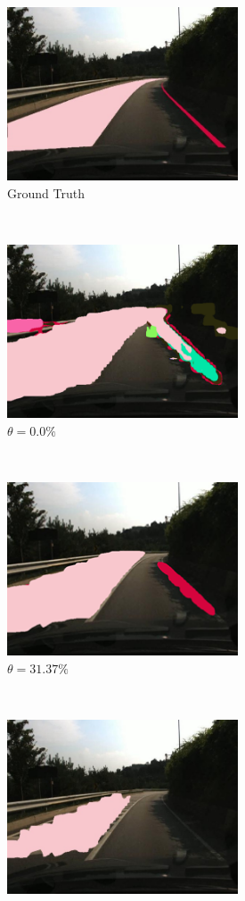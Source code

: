 \begin{spacing}{1.5}
\begin{figure}[!ht]
    \centering
    \begin{subfigure}[b]{0.49\textwidth}
        \centering
        \includegraphics[width=2.7in, fbox]{Chapter5/Picture3an.jpg}
        \caption{Ground Truth}
    \end{subfigure}%
    ~
    \begin{subfigure}[b]{0.49\textwidth}
        \centering
        \includegraphics[width=2.7in, fbox]{Chapter5/pic1conf0.png}
        \caption{$\theta = 0.0\%$}
    \end{subfigure}
    \\
    \begin{subfigure}[b]{0.49\textwidth}
        \centering
        \includegraphics[width=2.7in, fbox]{Chapter5/pic1conf31.png}
        \caption{$\theta = 31.37\%$}
    \end{subfigure}%
    ~
    \begin{subfigure}[b]{0.49\textwidth}
        \centering
        \includegraphics[width=2.7in, fbox]{Chapter5/pic1conf99.png}

\end{subfigure}
\end{figure}
\end{spacing}
